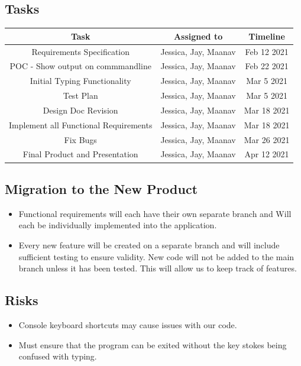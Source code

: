 \documentclass[12pt, titlepage]{article}
\begin{document}
\subsection{Tasks}
\begin{tabular}{|c|c|c|}
\hline
Task & Assigned to & Timeline \\
\hline
Requirements Specification & Jessica, Jay, Maanav & Feb 12 2021 \\
\hline
POC - Show output on commmandline & Jessica, Jay, Maanav & Feb 22 2021 \\
\hline
Initial Typing Functionality & Jessica, Jay, Maanav & Mar 5 2021\\
\hline
Test Plan & Jessica, Jay, Maanav & Mar 5 2021\\
\hline
Design Doc Revision & Jessica, Jay, Maanav & Mar 18 2021\\
\hline
Implement all Functional Requirements & Jessica, Jay, Maanav & Mar 18 2021\\
\hline
Fix Bugs & Jessica, Jay, Maanav & Mar 26 2021\\
\hline
Final Product and Presentation & Jessica, Jay, Maanav & Apr 12 2021\\
\hline
\end{tabular}

\subsection{Migration to the New Product}
\begin{itemize}
    \item Functional requirements will each have their own separate branch and Will each be individually implemented into the application.
    \item Every new feature will be created on a separate branch and will include sufficient testing to ensure validity. New code will not be added to the main branch unless it has been tested. This will allow us to keep track of features.
\end{itemize}

\subsection{Risks}
\begin{itemize}
    \item Console keyboard shortcuts may cause issues with our code.
    \item Must ensure that the program can be exited without the key stokes being confused with typing.
\end{itemize}
\end{document}
